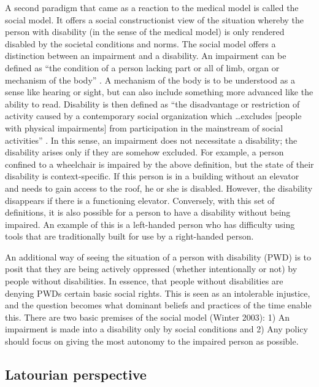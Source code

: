 \documentclass[a4paper]{article}
\begin{document}
A second paradigm that came as a reaction to the medical model is called the
social model. It offers a social constructionist view of the situation whereby
the person with disability (in the sense of the medical model) is only rendered
disabled by the societal conditions and norms. The social model offers a
distinction between an impairment and a disability. An impairment can be
defined as ``the condition of a person lacking part or all of limb, organ or
mechanism of the body'' \citep{winter2003development}. A mechanism of the body
is to be understood as a sense like hearing or sight, but can also include
something more advanced like the ability to read. Disability is then defined as
``the disadvantage or restriction of activity caused by a contemporary social
organization which \ldots excludes [people with physical impairments] from
participation in the mainstream of social activities''
\citep{winter2003development}. In this sense, an impairment does not
necessitate a disability; the disability arises only if they are somehow
excluded. For example, a person confined to a wheelchair is impaired by the
above definition, but the state of their disability is context-specific.  If
this person is in a building without an elevator and needs to gain access to
the roof, he or she is disabled. However, the disability disappears if there is
a functioning elevator. Conversely, with this set of definitions, it is also
possible for a person to have a disability without being impaired. An example
of this is a left-handed person who has difficulty using tools that are
traditionally built for use by a right-handed person.

An additional way of seeing the situation of a person with disability (PWD) is
to posit that they are being actively oppressed (whether intentionally or not)
by people without disabilities. In essence, that people without disabilities
are denying PWDs certain basic social rights. This is seen as an intolerable
injustice, and the question becomes what dominant beliefs and practices of the
time enable this. There are two basic premises of the social model (Winter
2003): 1) An impairment is made into a disability only by social conditions
and 2) Any policy should focus on giving the most autonomy to the impaired
person as possible.  



\subsection{Latourian perspective}
\end{document}
